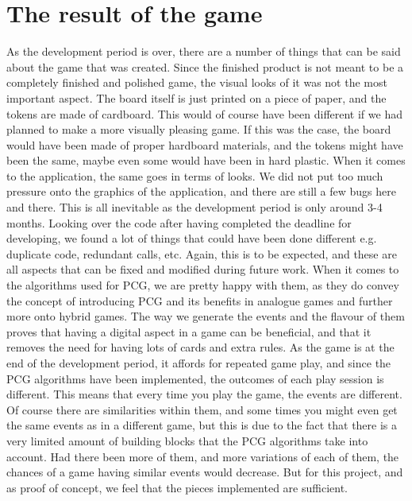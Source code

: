 \section{The result of the game}
As the development period is over, there are a number of things that can be said about the game that was created. Since the finished product is not meant to be a completely finished and polished game, the visual looks of it was not the most important aspect. The board itself is just printed on a piece of paper, and the tokens are made of cardboard. This would of course have been different if we had planned to make a more visually pleasing game. If this was the case, the board would have been made of proper hardboard materials, and the tokens might have been the same, maybe even some would have been in hard plastic. When it comes to the application, the same goes in terms of looks. We did not put too much pressure onto the graphics of the application, and there are still a few bugs here and there. This is all inevitable as the development period is only around 3-4 months. Looking over the code after having completed the deadline for developing, we found a lot of things that could have been done different e.g. duplicate code, redundant calls, etc. Again, this is to be expected, and these are all aspects that can be fixed and modified during future work.
When it comes to the algorithms used for PCG, we are pretty happy with them, as they do convey the concept of introducing PCG and its benefits in analogue games and further more onto hybrid games. The way we generate the events and the flavour of them proves that having a digital aspect in a game can be beneficial, and that it removes the need for having lots of cards and extra rules. As the game is at the end of the development period, it affords for repeated game play, and since the PCG algorithms have been implemented, the outcomes of each play session is different. This means that every time you play the game, the events are different. Of course there are similarities within them, and some times you might even get the same events as in a different game, but this is due to the fact that there is a very limited amount of building blocks that the PCG algorithms take into account. Had there been more of them, and more variations of each of them, the chances of a game having similar events would decrease. But for this project, and as proof of concept, we feel that the pieces implemented are sufficient.




